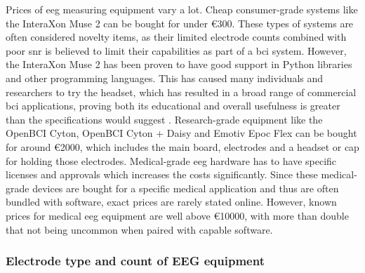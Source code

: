 Prices of \gls{eeg} measuring equipment vary a lot.
Cheap consumer-grade systems like the InteraXon Muse 2 can be bought for under €300.
These types of systems are often considered novelty items, as their limited electrode counts combined with poor \gls{snr} is believed to limit their capabilities as part of a \gls{bci} system.
However, the InteraXon Muse 2 has been proven to have good support in Python libraries and other programming languages.
This has caused many individuals and researchers to try the headset, which has resulted in a broad range of commercial \gls{bci} applications, proving both its educational and overall usefulness is greater than the specifications would suggest \citep{muse_comparison}.
Research-grade equipment like the OpenBCI Cyton, OpenBCI Cyton + Daisy and Emotiv Epoc Flex can be bought for around €2000, which includes the main board, electrodes and a headset or cap for holding those electrodes.
Medical-grade \gls{eeg} hardware has to have specific licenses and approvals which increases the costs significantly.
Since these medical-grade devices are bought for a specific medical application and thus are often bundled with software, exact prices are rarely stated online.
However, known prices for medical \gls{eeg} equipment are well above €10000, with more than double that not being uncommon when paired with capable software.



\subsubsection{Electrode type and count of EEG equipment}
\label{subsubsec:biomedical_signals_measuring_brain_equipment_electrodes}

